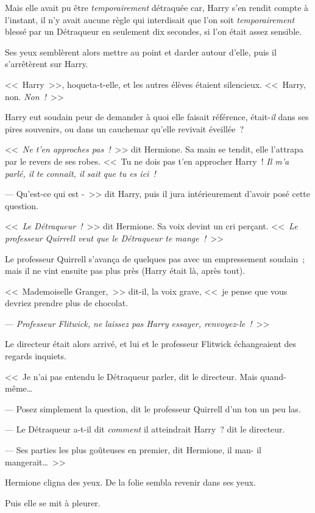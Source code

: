 Mais elle avait pu être \emph{temporairement} détraquée car, Harry s'en rendit compte à l'instant, il n'y avait aucune règle qui interdisait que l'on soit \emph{temporairement} blessé par un Détraqueur en seulement dix secondes, si l'on était assez sensible.

Ses yeux semblèrent alors mettre au point et darder autour d'elle, puis il s'arrêtèrent sur Harry.

<<~Harry~>>, hoqueta-t-elle, et les autres élèves étaient silencieux. <<~Harry, non. \emph{Non~!}~>>

Harry eut soudain peur de demander à quoi elle faisait référence, était-\emph{il} dans ses pires souvenirs, ou dans un cauchemar qu'elle revivait éveillée~?

<<~\emph{Ne t'en approches pas~!}~>> dit Hermione. Sa main se tendit, elle l'attrapa par le revers de ses robes. <<~Tu ne dois pas t'en approcher Harry~! \emph{Il m'a parlé, il te connaît, il sait que tu es ici~!}

--- Qu'est-ce qui est -~>> dit Harry, puis il jura intérieurement d'avoir posé cette question.

<<~\emph{Le Détraqueur~!}~>> dit Hermione. Sa voix devint un cri perçant. <<~\emph{Le professeur Quirrell veut que le Détraqueur te mange~!}~>>

Le professeur Quirrell s'avança de quelques pas avec un empressement soudain~; mais il ne vint ensuite pas plus près (Harry était là, après tout).

<<~Mademoiselle Granger,~>> dit-il, la voix grave, <<~je pense que vous devriez prendre plus de chocolat.

--- \emph{Professeur Flitwick, ne laissez pas Harry essayer, renvoyez-le~!}~>>

Le directeur était alors arrivé, et lui et le professeur Flitwick échangeaient des regards inquiets.

<<~Je n'ai pas entendu le Détraqueur parler, dit le directeur. Mais quand-même…

--- Posez simplement la question, dit le professeur Quirrell d'un ton un peu las.

--- Le Détraqueur a-t-il dit \emph{comment} il atteindrait Harry~? dit le directeur.

--- Ses parties les plus goûteuses en premier, dit Hermione, il man- il mangerait…~>>

Hermione cligna des yeux. De la folie sembla revenir dans ses yeux.

Puis elle se mit à pleurer.

